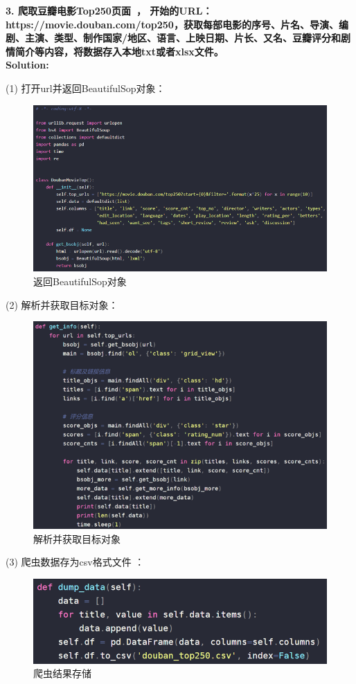 \documentclass{article}
\begin{document}
\begin{homeworkProblem}
\textbf{3.	爬取豆瓣电影Top250页面~\cite{guo2019buying}， 开始的URL：https://movie.douban.com/top250，获取每部电影的序号、片名、导演、编剧、主演、类型、制作国家/地区、语言、上映日期、片长、又名、豆瓣评分和剧情简介等内容，将数据存入本地txt或者xlsx文件。}\\
\textbf{Solution:}\\
{\color{blue}

(1) 打开url并返回BeautifulSop对象： 
\begin{figure}[H]  %
	\centering
	\includegraphics[width=0.75\linewidth]{images/Fig2}
	\caption{返回BeautifulSop对象}
	\label{fig:ucas-logo}
\end{figure}

(2) 解析并获取目标对象： 
\begin{figure}[H]  %
	\centering
	\includegraphics[width=0.75\linewidth]{images/Fig3}
	\caption{解析并获取目标对象}
	\label{fig:ucas-logo}
\end{figure}


(3) 爬虫数据存为csv格式文件 ：
	\begin{figure}[H]  %
		\centering
		\includegraphics[width=0.7\linewidth]{images/Fig4}
		\caption{爬虫结果存储}
		\label{fig:ucas-logo}
	\end{figure}

}
\end{homeworkProblem}
\end{document}
